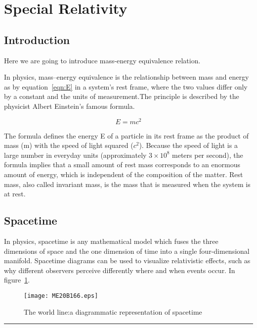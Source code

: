 \section{Special Relativity}


\subsection{Introduction}

Here we are going to introduce mass-energy equivalence relation.

In physics, mass–energy equivalence is the relationship between mass and energy as by equation~\ref{eqn:E} in a system's rest frame, where the two values differ only by a constant and the units of measurement.The principle is described by the physicist Albert Einstein's famous formula.~\cite{Einstie}

\begin{equation}
	E=mc^2
	\label{eqn:E}
\end{equation}

The formula defines the energy E of a particle in its rest frame as the product of mass (m) with the speed of light squared ($c^2$). Because the speed of light is a large number in everyday units (approximately $3 \times 10 ^8$ meters per second), the formula implies that a small amount of rest mass corresponds to an enormous amount of energy, which is independent of the composition of the matter. Rest mass, also called invariant mass, is the mass that is measured when the system is at rest.


\subsection{Spacetime}

In physics, spacetime is any mathematical model which fuses the three dimensions of space and the one dimension of time into a single four-dimensional manifold. Spacetime diagrams can be used to visualize relativistic effects, such as why different observers perceive differently where and when events occur. In figure~\ref{f1:spacetime}.~\cite{Einstie}

\begin{figure}[h]
	\begin{center}
		\texttt{[image: ME20B166.eps]}
	\end{center}
	\caption{The world line:a diagrammatic representation of spacetime}
	\label{f1:spacetime}
\end{figure}

\hrule
